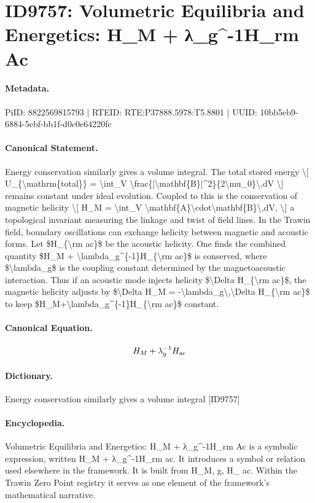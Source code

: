 \section*{ID9757: Volumetric Equilibria and Energetics: H\_M + λ\_g\textasciicircum{}-1H\_rm Ac}
\paragraph{Metadata.}
PiID: 8822569815793 | RTEID: RTE:P37888.5978:T5.8801 | UUID: 10bb5eb9-6884-5ebf-bb1f-d0c0e64220fc

\paragraph{Canonical Statement.}
Energy conservation similarly gives a volume integral. The total stored energy \textbackslash{}[ U\_\{\textbackslash{}mathrm\{total\}\} = \textbackslash{}int\_V \textbackslash{}frac\{|\textbackslash{}mathbf\{B\}|\textasciicircum{}2\}\{2\textbackslash{}mu\_0\}\textbackslash{},dV \textbackslash{}] remains constant under ideal evolution. Coupled to this is the conservation of magnetic helicity \textbackslash{}[ H\_M = \textbackslash{}int\_V \textbackslash{}mathbf\{A\}\textbackslash{}cdot\textbackslash{}mathbf\{B\}\textbackslash{},dV, \textbackslash{}] a topological invariant measuring the linkage and twist of field lines. In the Trawin field, boundary oscillations can exchange helicity between magnetic and acoustic forms. Let \$H\_\{\textbackslash{}rm ac\}\$ be the acoustic helicity. One finds the combined quantity \$H\_M + \textbackslash{}lambda\_g\textasciicircum{}\{-1\}H\_\{\textbackslash{}rm ac\}\$ is conserved, where \$\textbackslash{}lambda\_g\$ is the coupling constant determined by the magnetoacoustic interaction. Thus if an acoustic mode injects helicity \$\textbackslash{}Delta H\_\{\textbackslash{}rm ac\}\$, the magnetic helicity adjusts by \$\textbackslash{}Delta H\_M = -\textbackslash{}lambda\_g\textbackslash{},\textbackslash{}Delta H\_\{\textbackslash{}rm ac\}\$ to keep \$H\_M+\textbackslash{}lambda\_g\textasciicircum{}\{-1\}H\_\{\textbackslash{}rm ac\}\$ constant.

\paragraph{Canonical Equation.}
\[
H_M + \lambda_g^{-1}H_{\rm ac}
\]

\paragraph{Dictionary.}
Energy conservation similarly gives a volume integral [ID9757]

\paragraph{Encyclopedia.}
Volumetric Equilibria and Energetics: H\_M + λ\_g\textasciicircum{}-1H\_rm Ac is a symbolic expression, written H\_M + λ\_g\textasciicircum{}-1H\_rm ac. It introduces a symbol or relation used elsewhere in the framework. It is built from H\_M, g, H\_ ac. Within the Trawin Zero Point registry it serves as one element of the framework's mathematical narrative.
